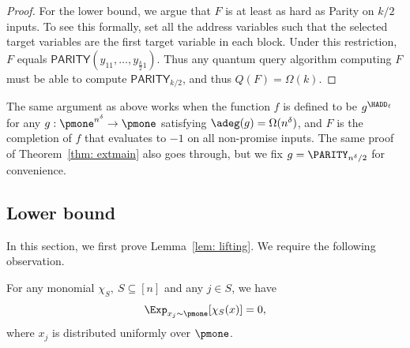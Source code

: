 \begin{proof}
For the lower bound, we argue that $F$ is at least as hard as Parity on $k/2$ inputs. To see this formally, set all the address variables such that the selected target variables are the first target variable in each block.  Under this restriction, $F$ equals $\mathsf{PARITY}(y_{11}, \dots, y_{\frac{k}{2}1})$.  Thus any quantum query algorithm computing $F$ must be able to compute $\mathsf{PARITY}_{k/2}$, and thus $Q(F)=\Omega(k)$.
\end{proof}

\begin{remark}\label{rmk: outer}
The same argument as above works when the function $f$ is defined to be $g^{\HADD_\ell}$ for any $g : \pmone^{n^{\delta}} \to \pmone$ satisfying $\adeg(g) = \Omega(n^{\delta})$, and $F$ is the completion of $f$ that evaluates to $-1$ on all non-promise inputs.  The same proof of Theorem~\ref{thm: extmain} also goes through, but we fix $g = \PARITY_{n^{\delta}/2}$ for convenience.
\end{remark}

\subsection{Lower bound}\label{sec: lower}

In this section, we first prove Lemma~\ref{lem: lifting}.
We require the following observation.
\begin{observation}\label{obs: obs}
For any monomial $\chi_S,~S\subseteq [n]$ and any $j\in S$, we have 
\[
\Exp_{x_j \sim \pmone}[\chi_S(x)] = 0,
\]
where $x_j$ is distributed uniformly over $\pmone$.
\end{observation}

